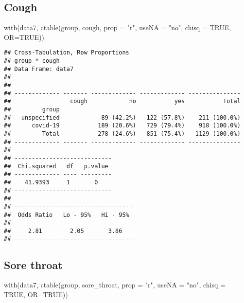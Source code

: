 \documentclass[
]{article}
\newenvironment{Shaded}{\begin{snugshade}}{\end{snugshade}}
\newcommand{\AttributeTok}[1]{\textcolor[rgb]{0.77,0.63,0.00}{#1}}
\newcommand{\ConstantTok}[1]{\textcolor[rgb]{0.00,0.00,0.00}{#1}}
\newcommand{\FunctionTok}[1]{\textcolor[rgb]{0.00,0.00,0.00}{#1}}
\newcommand{\NormalTok}[1]{#1}
\newcommand{\StringTok}[1]{\textcolor[rgb]{0.31,0.60,0.02}{#1}}
\begin{document}
\hypertarget{cough}{%
\subsection{Cough}\label{cough}}

\begin{Shaded}
\begin{Highlighting}[]
\FunctionTok{with}\NormalTok{(data7, }\FunctionTok{ctable}\NormalTok{(group, cough, }\AttributeTok{prop =} \StringTok{"r"}\NormalTok{, }\AttributeTok{useNA =} \StringTok{"no"}\NormalTok{, }\AttributeTok{chisq =} \ConstantTok{TRUE}\NormalTok{, }\AttributeTok{OR=}\ConstantTok{TRUE}\NormalTok{))}
\end{Highlighting}
\end{Shaded}

\begin{verbatim}
## Cross-Tabulation, Row Proportions  
## group * cough  
## Data Frame: data7  
## 
## 
## ------------- ------- ------------- ------------- ---------------
##                 cough            no           yes           Total
##         group                                                    
##   unspecified            89 (42.2%)   122 (57.8%)    211 (100.0%)
##      covid-19           189 (20.6%)   729 (79.4%)    918 (100.0%)
##         Total           278 (24.6%)   851 (75.4%)   1129 (100.0%)
## ------------- ------- ------------- ------------- ---------------
## 
## ----------------------------
##  Chi.squared   df   p.value 
## ------------- ---- ---------
##    41.9393     1       0    
## ----------------------------
## 
## ----------------------------------
##  Odds Ratio   Lo - 95%   Hi - 95% 
## ------------ ---------- ----------
##     2.81        2.05       3.86   
## ----------------------------------
\end{verbatim}

\hypertarget{sore-throat}{%
\subsection{Sore throat}\label{sore-throat}}

\begin{Shaded}
\begin{Highlighting}[]
\FunctionTok{with}\NormalTok{(data7, }\FunctionTok{ctable}\NormalTok{(group, sore\_throat, }\AttributeTok{prop =} \StringTok{"r"}\NormalTok{, }\AttributeTok{useNA =} \StringTok{"no"}\NormalTok{, }\AttributeTok{chisq =} \ConstantTok{TRUE}\NormalTok{, }\AttributeTok{OR=}\ConstantTok{TRUE}\NormalTok{))}
\end{Highlighting}
\end{Shaded}
\end{document}
